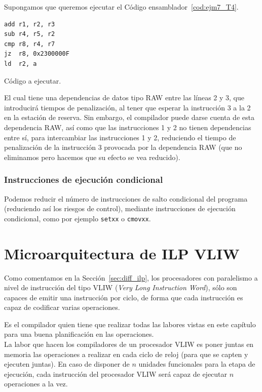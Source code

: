\begin{ejemplo}
    Supongamos que queremos ejecutar el Código ensamblador~\ref{cod:ejm7_T4}.
    \begin{listing}[H]
    \begin{verbatim}
add r1, r2, r3
sub r4, r5, r2
cmp r8, r4, r7
jz  r8, 0x2300000F
ld  r2, a
    \end{verbatim}
    \caption{Código a ejecutar.}
    \label{cod:ejm7_T4}
    \end{listing}
    El cual tiene una dependencias de datos tipo RAW entre las líneas 2 y 3, que introducirá tiempos de penalización, al tener que esperar la instrucción 3 a la 2 en la estación de reserva. Sin embargo, el compilador puede darse cuenta de esta dependencia RAW, así como que las instrucciones 1 y 2 no tienen dependencias entre sí, para intercambiar las instrucciones 1 y 2, reduciendo el tiempo de penalización de la instrucción 3 provocada por la dependencia RAW (que no eliminamos pero hacemos que su efecto se vea reducido).
\end{ejemplo}

\subsubsection{Instrucciones de ejecución condicional}
Podemos reducir el número de instrucciones de salto condicional del programa (reduciendo así los riesgos de control), mediante instrucciones de ejecución condicional, como por ejemplo \verb|setxx| o \verb|cmovxx|.

\section{Microarquitectura de ILP VLIW}
Como comentamos en la Sección~\ref{sec:diff_ilp}, los procesadores con paralelismo a nivel de instrucción del tipo VLIW (\emph{Very Long Instruction Word}), sólo son capaces de emitir una instrucción por ciclo, de forma que cada instrucción es capaz de codificar varias operaciones.

Es el compilador quien tiene que realizar todas las labores vistas en este capítulo para una buena planificación en las operaciones.\\

La labor que hacen los compiladores de un procesador VLIW es poner juntas en memoria las operaciones a realizar en cada ciclo de reloj (para que se capten y ejecuten juntas). En caso de disponer de $n$ unidades funcionales para la etapa de ejecución, cada instrucción del procesador VLIW será capaz de ejecutar $n$ operaciones a la vez.\\

